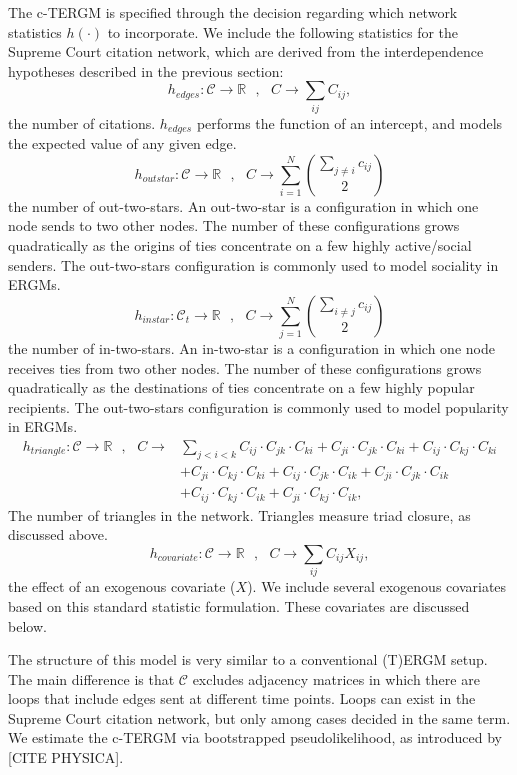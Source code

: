 \documentclass[headsepline=true, abstracton]{scrartcl}
\begin{document}
The c-TERGM is specified through 
the decision regarding which network statistics $h(\cdot)$ to incorporate. We include the following statistics for the Supreme Court citation network, which are derived from the interdependence hypotheses described in the previous section:
$$h_{edges}:\mathcal{C} \to \mathbb{R}~~~, ~~~C \to \sum_{ij} C_{ij}, $$
the number of citations.  $h_{edges}$ performs the function of an intercept, and models the expected value of any given edge.
$$h_{outstar}:\mathcal{C} \to \mathbb{R}~~~, ~~~C \to \sum_{i=1}^N {\sum_{j \neq i} c_{ij} \choose 2} $$
the number of out-two-stars. An out-two-star is a configuration in which one node sends to two other nodes. The number of these configurations grows quadratically as the origins of ties concentrate on a few highly active/social senders. The out-two-stars configuration is commonly used to model sociality in ERGMs.
$$h_{instar}:\mathcal{C}_t \to \mathbb{R}~~~, ~~~C \to \sum_{j=1}^N {\sum_{i \neq j} c_{ij} \choose 2} $$
the number of in-two-stars. An in-two-star is a configuration in which one node receives ties from two other nodes. The number of these configurations grows quadratically as the destinations of ties concentrate on a few highly popular recipients. The out-two-stars configuration is commonly used to model popularity in ERGMs.
\begin{align*}
h_{triangle}:\mathcal{C} \to \mathbb{R}~~~, ~~~C \to & \sum_{j<i<k} C_{ij}\cdot C_{jk} \cdot C_{ki} + C_{ji}\cdot C_{jk} \cdot C_{ki} + C_{ij}\cdot C_{kj} \cdot C_{ki} \\ & + C_{ji}\cdot C_{kj} \cdot C_{ki} + C_{ij}\cdot C_{jk} \cdot C_{ik} + C_{ji}\cdot C_{jk} \cdot C_{ik}  \\ & + C_{ij}\cdot C_{kj} \cdot C_{ik} + C_{ji}\cdot C_{kj} \cdot C_{ik},  
\end{align*}
The number of triangles in the network.  Triangles measure triad closure, as discussed above. $$h_{covariate}:\mathcal{C} \to \mathbb{R}~~~, ~~~C \to \sum_{ij} C_{ij}X_{ij}, $$ the effect of an exogenous covariate ($X$). We include several exogenous covariates based on this standard statistic formulation. These covariates are discussed below.

The structure of this model is very similar to a conventional (T)ERGM setup. The main difference is that  $\mathcal{C}$ excludes adjacency matrices in which there are loops that include edges sent at different time points. Loops can exist in the Supreme Court citation network, but only among cases decided in the same term. We estimate the c-TERGM via bootstrapped pseudolikelihood, as introduced by [CITE PHYSICA]. 
\end{document}
